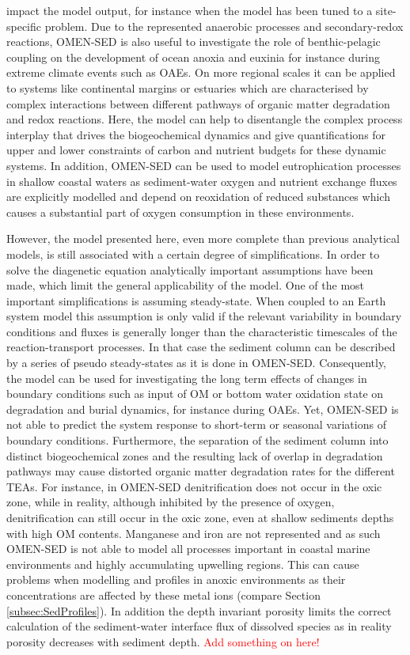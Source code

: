 \documentclass[gmd, manuscript]{copernicus}
\begin{document}
impact the model output, for instance when the model has been tuned to a site-specific problem. 
Due to the represented anaerobic processes and secondary-redox reactions, OMEN-SED is also useful to investigate the role of benthic-pelagic coupling on the development of ocean anoxia and euxinia for instance during extreme climate 
events such as OAEs. On more regional scales it can be applied to systems like continental margins or estuaries which are characterised by complex interactions between different pathways of organic matter degradation and redox reactions. 
Here, the model can help to disentangle the complex process interplay that drives the biogeochemical dynamics and give quantifications for upper and lower constraints of carbon and nutrient budgets for these dynamic systems. 
In addition, OMEN-SED can be used to model eutrophication processes in shallow coastal waters as sediment-water oxygen and nutrient exchange fluxes are explicitly modelled and depend on reoxidation of reduced substances which causes 
a substantial part of oxygen consumption in these environments. %

However, the model presented here, even more complete than previous analytical models, is still associated with a certain degree of simplifications. In order to solve the diagenetic equation analytically important assumptions have been made, which limit 
the general applicability of the model. One of the most important simplifications is assuming steady-state. 
When coupled to an Earth system model this assumption is only valid if the relevant variability in boundary conditions and fluxes is generally longer than the characteristic timescales of the reaction-transport processes. 
In that case the sediment column can be described by a series of pseudo steady-states as it is done in OMEN-SED. Consequently, the model can be used for investigating the long term effects of changes in boundary conditions such as input of OM 
or bottom water oxidation state on degradation and burial dynamics, for instance during OAEs. Yet, OMEN-SED is not able to predict the system response to short-term or seasonal variations of boundary conditions. 
Furthermore, the separation of the sediment column into distinct biogeochemical zones and the resulting lack of overlap in degradation pathways may cause distorted organic matter degradation rates for the different TEAs. 
For instance, in OMEN-SED denitrification does not occur in the oxic zone, while in reality, although inhibited by the presence of oxygen, denitrification can still occur in the oxic zone, even at shallow sediments depths with high OM contents. 
Manganese and iron are not represented and as such OMEN-SED is not able to model all processes important in coastal marine environments and highly accumulating upwelling regions. This can cause problems when modelling  and  
profiles in anoxic environments as their concentrations are affected by these metal ions (compare Section \ref{subsec:SedProfiles}). 
In addition the depth invariant porosity limits the correct calculation of the sediment-water interface flux of dissolved species as in reality porosity decreases with sediment depth. 
\textcolor{red}{Add something on  here!}
\end{document}
